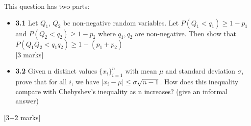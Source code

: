 \begin{que}
	This question has two parts:
	\begin{itemize}
		\item \textbf{3.1} Let $Q_{1}$, $Q_{2}$ be non-negative random
		      variables. Let $P(Q_1 < q_1) \geq 1-p_1$ and $P(Q_2 < q_2)
			      \geq 1-p_2$ where $q_1, q_2$ are non-negative. Then show
		      that $P(Q_1Q_2 < q_1q_2) \geq 1 - (p_1 + p_2)$\\
		      \hspace*{\fill} [3 marks]
		\item \textbf{3.2} Given n distinct values ${\{x_i\}}^n_{i=1}$
		      with mean $\mu$ and standard deviation $\sigma$, prove that
		      for all $i$, we have $|x_i - \mu| \leq \sigma\sqrt{n-1}$. How does this inequality compare with
		      Chebyshev's inequality as n increases? (give an informal
		      answer)
	\end{itemize}
	\hspace*{\fill} [3+2 marks]
\end{que}

